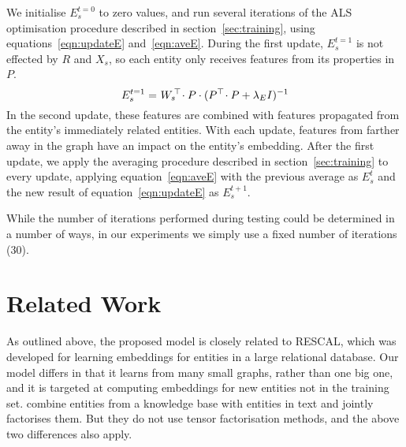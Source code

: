 \documentclass[11pt,a4paper]{article}
\newcommand{\trans}{{}^{\top}}
\begin{document}
We initialise $E^{t=0}_s$ to zero values, and run several iterations of the
ALS optimisation procedure described in section~\ref{sec:training}, using
equations~\ref{eqn:updateE} and~\ref{eqn:aveE}.  During the first update,
$E^{t=1}_s$ is not effected by $R$ and $X_s$, so each entity only receives
features from its properties in $P$.
\vspace{-0.5ex}
\begin{align*}
E^{t=1}_s =~& W_s\!\trans\! \cdot P \cdot (P\trans\! \cdot P + \lambda_E I\/)^{-1}
\\[-4ex]\nonumber
\end{align*}
In the second update, these features are combined with features propagated
from the entity's immediately related entities.  With each update, features
from farther away in the graph have an impact on the entity's embedding.
After the first update, we apply the averaging procedure described in
section~\ref{sec:training} to every update, applying equation~\ref{eqn:aveE}
with the previous average as $E^{t}_s$ and the new result of
equation~\ref{eqn:updateE} as $E^{t+1}_s$.

While the number of iterations performed during testing could be
determined in a number of ways, in our experiments we simply use a
fixed number of iterations (30).




\section{Related Work}

As outlined above, the proposed model is closely related to RESCAL,
which was developed for learning embeddings for entities in a large
relational database.  Our model differs in that it learns from many
small graphs, rather than one big one, and it is targeted at computing
embeddings for new entities not in the training set.  \citet{riedel2013}
combine entities from a knowledge
base with entities in text and jointly factorises them.  But they do
not use tensor factorisation methods, and the above two differences
also apply.
\end{document}
